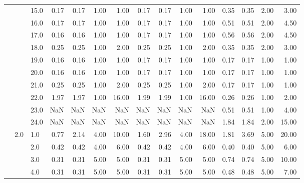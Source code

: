 \begin{tabular}{lllrrrrrrrrrrrr}
       &     & 15.0 &       0.17 &      0.17 & 1.00 &   1.00 &       0.17 &      0.17 &  1.00 &   1.00 &       0.35 &      0.35 &  2.00 &   3.00 \\
       &     & 16.0 &       0.17 &      0.17 & 1.00 &   1.00 &       0.17 &      0.17 &  1.00 &   1.00 &       0.51 &      0.51 &  2.00 &   4.50 \\
       &     & 17.0 &       0.16 &      0.16 & 1.00 &   1.00 &       0.17 &      0.17 &  1.00 &   1.00 &       0.56 &      0.56 &  2.00 &   4.50 \\
       &     & 18.0 &       0.25 &      0.25 & 1.00 &   2.00 &       0.25 &      0.25 &  1.00 &   2.00 &       0.35 &      0.35 &  2.00 &   3.00 \\
       &     & 19.0 &       0.16 &      0.16 & 1.00 &   1.00 &       0.17 &      0.17 &  1.00 &   1.00 &       0.17 &      0.17 &  1.00 &   1.00 \\
       &     & 20.0 &       0.16 &      0.16 & 1.00 &   1.00 &       0.17 &      0.17 &  1.00 &   1.00 &       0.17 &      0.17 &  1.00 &   1.00 \\
       &     & 21.0 &       0.25 &      0.25 & 1.00 &   2.00 &       0.25 &      0.25 &  1.00 &   2.00 &       0.17 &      0.17 &  1.00 &   1.00 \\
       &     & 22.0 &       1.97 &      1.97 & 1.00 &  16.00 &       1.99 &      1.99 &  1.00 &  16.00 &       0.26 &      0.26 &  1.00 &   2.00 \\
       &     & 23.0 &        NaN &       NaN &  NaN &    NaN &        NaN &       NaN &   NaN &    NaN &       0.51 &      0.51 &  1.00 &   4.00 \\
       &     & 24.0 &        NaN &       NaN &  NaN &    NaN &        NaN &       NaN &   NaN &    NaN &       1.84 &      1.84 &  2.00 &  15.00 \\
       & 2.0 & 1.0  &       0.77 &      2.14 & 4.00 &  10.00 &       1.60 &      2.96 &  4.00 &  18.00 &       1.81 &      3.69 &  5.00 &  20.00 \\
       &     & 2.0  &       0.42 &      0.42 & 4.00 &   6.00 &       0.42 &      0.42 &  4.00 &   6.00 &       0.40 &      0.40 &  5.00 &   6.00 \\
       &     & 3.0  &       0.31 &      0.31 & 5.00 &   5.00 &       0.31 &      0.31 &  5.00 &   5.00 &       0.74 &      0.74 &  5.00 &  10.00 \\
       &     & 4.0  &       0.31 &      0.31 & 5.00 &   5.00 &       0.31 &      0.31 &  5.00 &   5.00 &       0.48 &      0.48 &  5.00 &   7.00 \\

\end{tabular}
